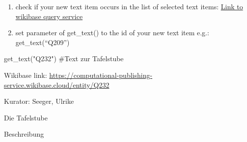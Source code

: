\documentclass[
  a4paper,
  portrait]{book}
\newenvironment{Shaded}{\begin{snugshade}}{\end{snugshade}}
\newcommand{\CommentTok}[1]{\textcolor[rgb]{0.37,0.37,0.37}{#1}}
\newcommand{\NormalTok}[1]{\textcolor[rgb]{0.00,0.23,0.31}{#1}}
\newcommand{\StringTok}[1]{\textcolor[rgb]{0.13,0.47,0.30}{#1}}
\begin{document}
\begin{enumerate}
\def\labelenumi{\arabic{enumi}.}
\setcounter{enumi}{1}
\item
  check if your new text item occurs in the list of selected text items:
  \href{https://computational-publishing-service.wikibase.cloud/query/\#PREFIX\%20cps\%3A\%20\%3Chttps\%3A\%2F\%2Fcomputational-publishing-service.wikibase.cloud\%2Fentity\%2F\%3E\%0APREFIX\%20cpss\%3A\%20\%3Chttps\%3A\%2F\%2Fcomputational-publishing-service.wikibase.cloud\%2Fentity\%2Fstatement\%2F\%3E\%0APREFIX\%20cpsv\%3A\%20\%3Chttps\%3A\%2F\%2Fcomputational-publishing-service.wikibase.cloud\%2Fvalue\%2F\%3E\%0APREFIX\%20cpspt\%3A\%20\%3Chttps\%3A\%2F\%2Fcomputational-publishing-service.wikibase.cloud\%2Fprop\%2Fdirect\%2F\%3E\%0APREFIX\%20cpsp\%3A\%20\%3Chttps\%3A\%2F\%2Fcomputational-publishing-service.wikibase.cloud\%2Fprop\%2F\%3E\%0APREFIX\%20cpsps\%3A\%20\%3Chttps\%3A\%2F\%2Fcomputational-publishing-service.wikibase.cloud\%2Fprop\%2Fstatement\%2F\%3E\%0APREFIX\%20cpspq\%3A\%20\%3Chttps\%3A\%2F\%2Fcomputational-publishing-service.wikibase.cloud\%2Fprop\%2Fqualifier\%2F\%3E\%0A\%0ASELECT\%20\%3FtextItem\%20\%3FkuratorLabel\%20\%3FtextUrl\%0AWHERE\%0A\%7B\%0A\%20\%20\%3FtextItem\%20cpsp\%3AP46\%20\%3FkuratorStatement.\%20\%0A\%20\%20\%3FkuratorStatement\%20cpsps\%3AP46\%20\%3FkuratorItem.\%20\%0A\%20\%20\%3FkuratorItem\%20rdfs\%3Alabel\%20\%3FkuratorLabel.\%0A\%20\%20\%3FtextItem\%20cpsp\%3AP57\%20\%3Furlstatement.\%20\%0A\%20\%20\%3Furlstatement\%20cpsps\%3AP57\%20\%3FtextUrl.\%20\%0A\%7D}{Link
  to wikibase query service}
\item
  set parameter of get\_text() to the id of your new text item e.g.:
  get\_text(``Q209'')
\end{enumerate}

\begin{Shaded}
\begin{Highlighting}[]
\NormalTok{get\_text(}\StringTok{"Q232"}\NormalTok{)}
\CommentTok{\#Text zur Tafelstube}
\end{Highlighting}
\end{Shaded}

Wikibase link:
\url{https://computational-publishing-service.wikibase.cloud/entity/Q232}

Kurator: Seeger, Ulrike

Die Tafelstube

Beschreibung
\end{document}
